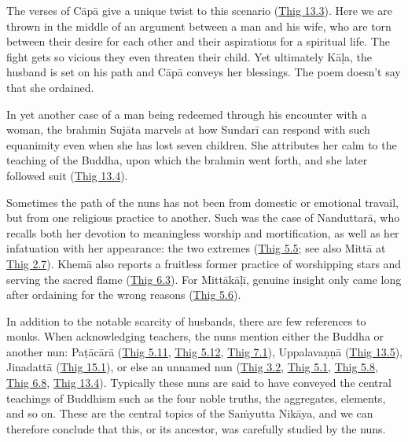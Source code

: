 \documentclass[12pt,openany]{book}%
\begin{document}
The verses of \textsanskrit{Cāpā} give a unique twist to this scenario (\href{https://suttacentral.net/thig13.3}{Thig 13.3}). Here we are thrown in the middle of an argument between a man and his wife, who are torn between their desire for each other and their aspirations for a spiritual life. The fight gets so vicious they even threaten their child. Yet ultimately \textsanskrit{Kāḷa}, the husband is set on his path and \textsanskrit{Cāpā} conveys her blessings. The poem doesn’t say that she ordained.

In yet another case of a man being redeemed through his encounter with a woman, the brahmin \textsanskrit{Sujāta} marvels at how \textsanskrit{Sundarī} can respond with such equanimity even when she has lost seven children. She attributes her calm to the teaching of the Buddha, upon which the brahmin went forth, and she later followed suit (\href{https://suttacentral.net/thig13.4}{Thig 13.4}).

Sometimes the path of the nuns has not been from domestic or emotional travail, but from one religious practice to another. Such was the case of \textsanskrit{Nanduttarā}, who recalls both her devotion to meaningless worship and mortification, as well as her infatuation with her appearance: the two extremes (\href{https://suttacentral.net/thig5.5}{Thig 5.5}; see also \textsanskrit{Mittā} at \href{https://suttacentral.net/thig2.7}{Thig 2.7}). \textsanskrit{Khemā} also reports a fruitless former practice of worshipping stars and serving the sacred flame (\href{https://suttacentral.net/thig6.3}{Thig 6.3}). For \textsanskrit{Mittākāḷī}, genuine insight only came long after ordaining for the wrong reasons (\href{https://suttacentral.net/thig5.6}{Thig 5.6}).

In addition to the notable scarcity of husbands, there are few references to monks. When acknowledging teachers, the nuns mention either the Buddha or another nun: \textsanskrit{Paṭācārā} (\href{https://suttacentral.net/thig5.11}{Thig 5.11}, \href{https://suttacentral.net/thig5.12}{Thig 5.12}, \href{https://suttacentral.net/thig7.1}{Thig 7.1}), \textsanskrit{Uppalavaṇṇā} (\href{https://suttacentral.net/thig13.5}{Thig 13.5}), \textsanskrit{Jinadattā} (\href{https://suttacentral.net/thig15.1}{Thig 15.1}), or else an unnamed nun (\href{https://suttacentral.net/thig3.2}{Thig 3.2}, \href{https://suttacentral.net/thig5.1}{Thig 5.1}, \href{https://suttacentral.net/thig5.8}{Thig 5.8}, \href{https://suttacentral.net/thig6.8}{Thig 6.8}, \href{https://suttacentral.net/thig13.4}{Thig 13.4}). Typically these nuns are said to have conveyed the central teachings of Buddhism such as the four noble truths, the aggregates, elements, and so on. These are the central topics of the \textsanskrit{Saṁyutta} \textsanskrit{Nikāya}, and we can therefore conclude that this, or its ancestor, was carefully studied by the nuns.
\end{document}

